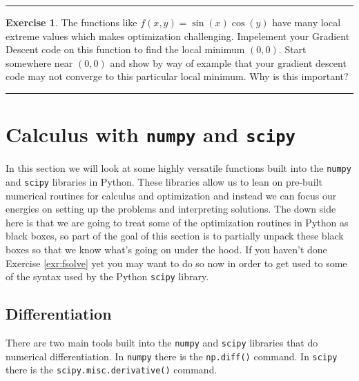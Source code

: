 \documentclass[
]{book}
\theoremstyle{definition}
\theoremstyle{definition}
\theoremstyle{definition}
\newtheorem{exercise}{Exercise}[chapter]
\theoremstyle{remark}
\begin{document}
\begin{center}\rule{0.5\linewidth}{0.5pt}\end{center}

\begin{exercise}
\protect\hypertarget{exr:unnamed-chunk-210}{}{\label{exr:unnamed-chunk-210} }The functions like \(f(x,y) = \sin(x)\cos(y)\) have many local extreme
values which makes optimization challenging. Impelement your Gradient
Descent code on this function to find the local minimum \((0,0)\). Start
somewhere near \((0,0)\) and show by way of example that your gradient
descent code may not converge to this particular local minimum. Why is
this important?
\end{exercise}

\begin{center}\rule{0.5\linewidth}{0.5pt}\end{center}

\hypertarget{calculus-with-numpy-and-scipy}{%
\section{\texorpdfstring{Calculus with \texttt{numpy} and \texttt{scipy}}{Calculus with numpy and scipy}}\label{calculus-with-numpy-and-scipy}}

In this section we will look at some highly versatile functions built into the \texttt{numpy} and \texttt{scipy} libraries in Python. These libraries allow us to lean on pre-built numerical routines for calculus and optimization and instead we can focus our energies on setting up the problems and interpreting solutions. The down side here is that we are going to treat some of the optimization routines in Python as black boxes, so part of the goal of this section is to partially unpack these black boxes so that we know what's going on under the hood. If you haven't done Exercise \ref{exr:fsolve} yet you may want to do so now in order to get used to some of the syntax used by the Python \texttt{scipy} library.

\hypertarget{differentiation-1}{%
\subsection{Differentiation}\label{differentiation-1}}

There are two main tools built into the \texttt{numpy} and \texttt{scipy} libraries that do numerical differentiation. In \texttt{numpy} there is the \texttt{np.diff()} command. In \texttt{scipy} there is the \texttt{scipy.misc.derivative()} command.
\end{document}
